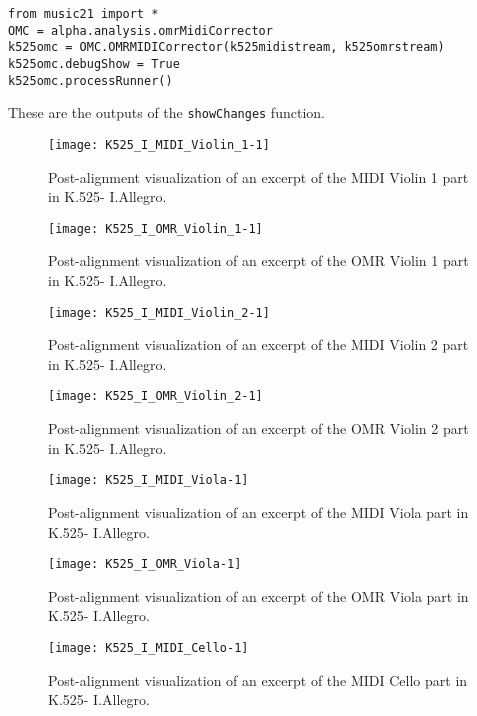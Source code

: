 \begin{verbatim}
from music21 import *
OMC = alpha.analysis.omrMidiCorrector
k525omc = OMC.OMRMIDICorrector(k525midistream, k525omrstream)
k525omc.debugShow = True
k525omc.processRunner()
\end{verbatim}

These are the outputs of the \texttt{showChanges} function.

\begin{figure}[H]
\centering
\texttt{[image: K525\_I\_MIDI\_Violin\_1-1]}
\caption{Post-alignment visualization of an excerpt of the MIDI Violin 1 part in K.525- I.Allegro.}
\end{figure}

\begin{figure}[H]
\centering
\texttt{[image: K525\_I\_OMR\_Violin\_1-1]}
\caption{Post-alignment visualization of an excerpt of the OMR Violin 1 part in K.525- I.Allegro.}
\end{figure}

\begin{figure}[H]
\centering
\texttt{[image: K525\_I\_MIDI\_Violin\_2-1]}
\caption{Post-alignment visualization of an excerpt of the MIDI Violin 2 part in K.525- I.Allegro.}
\end{figure}

\begin{figure}[H]
\centering
\texttt{[image: K525\_I\_OMR\_Violin\_2-1]}
\caption{Post-alignment visualization of an excerpt of the OMR Violin 2 part in K.525- I.Allegro.}
\end{figure}

\begin{figure}[H]
\centering
\texttt{[image: K525\_I\_MIDI\_Viola-1]}
\caption{Post-alignment visualization of an excerpt of the MIDI Viola part in K.525- I.Allegro.}
\end{figure}

\begin{figure}[H]
\centering
\texttt{[image: K525\_I\_OMR\_Viola-1]}
\caption{Post-alignment visualization of an excerpt of the OMR Viola part in K.525- I.Allegro.}
\end{figure}

\begin{figure}[H]
\centering
\texttt{[image: K525\_I\_MIDI\_Cello-1]}
\caption{Post-alignment visualization of an excerpt of the MIDI Cello part in K.525- I.Allegro.}
\end{figure}

